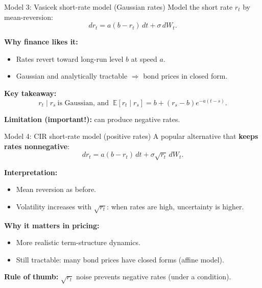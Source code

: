 \documentclass[10pt,aspectratio=169]{beamer}
\begin{document}
\begin{frame}{Model 3: Vasicek short-rate model (Gaussian rates)}
Model the short rate $r_t$ by mean-reversion:
\[
dr_t = a(b-r_t)\,dt + \sigma\, dW_t.
\]

\medskip
\textbf{Why finance likes it:}
\begin{itemize}
  \item Rates revert toward long-run level $b$ at speed $a$.
  \item Gaussian and analytically tractable $\Rightarrow$ bond prices in closed form.
\end{itemize}

\medskip
\textbf{Key takeaway:}
\[
r_t \mid r_s \ \text{is Gaussian, and }\ \mathbb{E}[r_t\mid r_s]=b+(r_s-b)e^{-a(t-s)}.
\]

\medskip
\textbf{Limitation (important!):} can produce negative rates.
\end{frame}

\begin{frame}{Model 4: CIR short-rate model (positive rates)}
A popular alternative that \textbf{keeps rates nonnegative}:
\[
dr_t = a(b-r_t)\,dt + \sigma\sqrt{r_t}\, dW_t.
\]

\medskip
\textbf{Interpretation:}
\begin{itemize}
  \item Mean reversion as before.
  \item Volatility increases with $\sqrt{r_t}$: when rates are high, uncertainty is higher.
\end{itemize}

\medskip
\textbf{Why it matters in pricing:}
\begin{itemize}
  \item More realistic term-structure dynamics.
  \item Still tractable: many bond prices have closed forms (affine model).
\end{itemize}

\medskip
\textbf{Rule of thumb:} $\sqrt{r_t}$ noise prevents negative rates (under a condition).
\end{frame}
\end{document}

